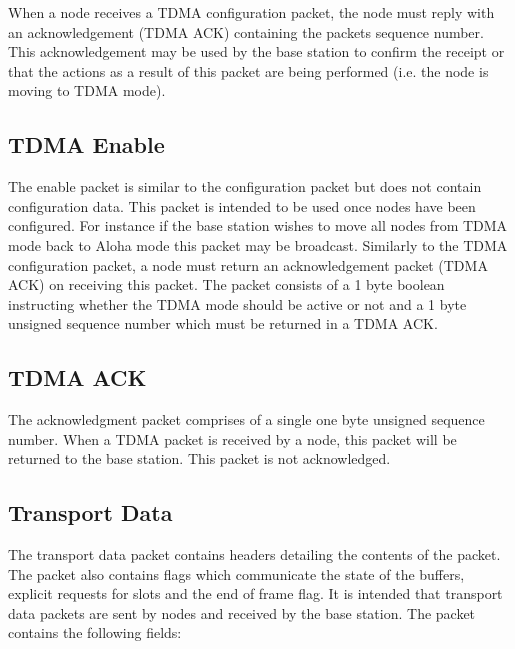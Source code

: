 \documentclass[parskip]{cs4rep}
\begin{document}
When a node receives a TDMA configuration packet, the node must reply with an acknowledgement (TDMA ACK) containing the packets sequence number. This acknowledgement may be used by the base station to confirm the receipt or that the actions as a result of this packet are being performed (i.e. the node is moving to TDMA mode).

\subsection{TDMA Enable}

The enable packet is similar to the configuration packet but does not contain configuration data. This packet is intended to be used once nodes have been configured. For instance if the base station wishes to move all nodes from TDMA mode back to Aloha mode this packet may be broadcast. Similarly to the TDMA configuration packet, a node must return an acknowledgement packet (TDMA ACK) on receiving this packet. The packet consists of a 1 byte boolean instructing whether the TDMA mode should be active or not and a 1 byte unsigned sequence number which must be returned in a TDMA ACK.

\subsection{TDMA ACK}

The acknowledgment packet comprises of a single one byte unsigned sequence number. When a TDMA packet is received by a node, this packet will be returned to the base station. This packet is not acknowledged.

\subsection{Transport Data}

The transport data packet contains headers detailing the contents of the packet. The packet also contains flags which communicate the state of the buffers, explicit requests for slots and the end of frame flag. It is intended that transport data packets are sent by nodes and received by the base station. The packet contains the following fields:
\end{document}
